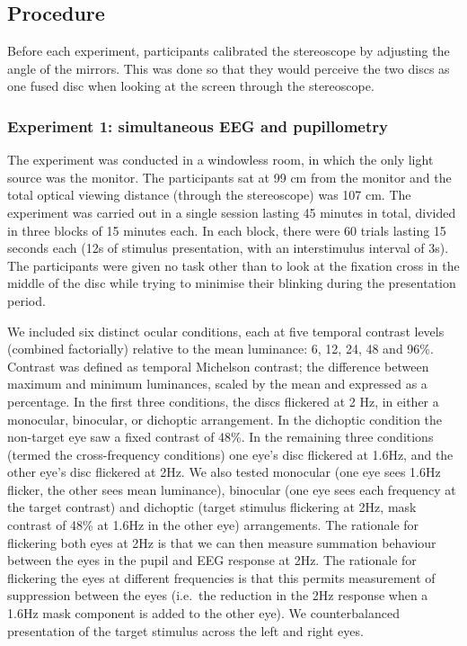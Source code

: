 \documentclass[
]{article}
\begin{document}
\hypertarget{procedure}{%
\subsection{Procedure}\label{procedure}}

Before each experiment, participants calibrated the stereoscope by adjusting the angle of the mirrors. This was done so that they would perceive the two discs as one fused disc when looking at the screen through the stereoscope.

\hypertarget{experiment-1-simultaneous-eeg-and-pupillometry}{%
\subsubsection{Experiment 1: simultaneous EEG and pupillometry}\label{experiment-1-simultaneous-eeg-and-pupillometry}}

The experiment was conducted in a windowless room, in which the only light source was the monitor. The participants sat at 99 cm from the monitor and the total optical viewing distance (through the stereoscope) was 107 cm. The experiment was carried out in a single session lasting 45 minutes in total, divided in three blocks of 15 minutes each. In each block, there were 60 trials lasting 15 seconds each (12s of stimulus presentation, with an interstimulus interval of 3s). The participants were given no task other than to look at the fixation cross in the middle of the disc while trying to minimise their blinking during the presentation period.

We included six distinct ocular conditions, each at five temporal contrast levels (combined factorially) relative to the mean luminance: 6, 12, 24, 48 and 96\%. Contrast was defined as temporal Michelson contrast; the difference between maximum and minimum luminances, scaled by the mean and expressed as a percentage. In the first three conditions, the discs flickered at 2 Hz, in either a monocular, binocular, or dichoptic arrangement. In the dichoptic condition the non-target eye saw a fixed contrast of 48\%. In the remaining three conditions (termed the cross-frequency conditions) one eye's disc flickered at 1.6Hz, and the other eye's disc flickered at 2Hz. We also tested monocular (one eye sees 1.6Hz flicker, the other sees mean luminance), binocular (one eye sees each frequency at the target contrast) and dichoptic (target stimulus flickering at 2Hz, mask contrast of 48\% at 1.6Hz in the other eye) arrangements. The rationale for flickering both eyes at 2Hz is that we can then measure summation behaviour between the eyes in the pupil and EEG response at 2Hz. The rationale for flickering the eyes at different frequencies is that this permits measurement of suppression between the eyes (i.e.~the reduction in the 2Hz response when a 1.6Hz mask component is added to the other eye). We counterbalanced presentation of the target stimulus across the left and right eyes.
\end{document}
